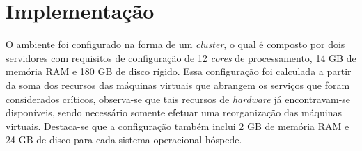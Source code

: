 



\section{Implementação}
\label{section:implementacao}


O ambiente foi configurado na forma de um \textit{cluster}, o qual é composto por dois servidores com requisitos de configuração 
de 12 \textit{cores} de processamento, 14 GB de memória \ac{RAM} e 180 GB de disco rígido.
Essa configuração foi calculada a partir da soma dos recursos das máquinas virtuais que abrangem os serviços que foram considerados 
críticos, observa-se que tais recursos de \textit{hardware} já encontravam-se disponíveis, sendo necessário somente efetuar uma reorganização 
das máquinas virtuais. Destaca-se que a configuração também inclui 2 GB de memória \ac{RAM} e 24 GB de disco para cada sistema operacional hóspede.


